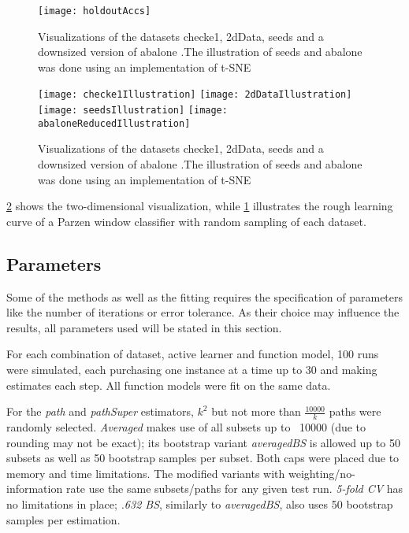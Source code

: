 \begin{figure}[h]
	\centering
	\texttt{[image: holdoutAccs]}
	\caption{Visualizations of the datasets checke1, 2dData, seeds and a downsized version of abalone \cite{Chapelle2005,KremplEtAl2014,CharytanowiczEtAl2010,NashEtAl1994}.\newline The illustration of seeds and abalone was done using an implementation of t-SNE \cite{vanDerMaaten2008}}
	\label{fig:holdoutAccs}
\end{figure}

\begin{figure}[h]
	\centering
	\texttt{[image: checke1Illustration]}
	\texttt{[image: 2dDataIllustration]}
	\texttt{[image: seedsIllustration]}
	\texttt{[image: abaloneReducedIllustration]}
	\caption{Visualizations of the datasets checke1, 2dData, seeds and a downsized version of abalone \cite{Chapelle2005,KremplEtAl2014,CharytanowiczEtAl2010,NashEtAl1994}.\newline The illustration of seeds and abalone was done using an implementation of t-SNE \cite{vanDerMaaten2008}}
	\label{fig:datasetIllustrations}
\end{figure}

\ref{fig:datasetIllustrations} shows the two-dimensional visualization, while \ref{fig:holdoutAccs} illustrates the rough learning curve of a Parzen window classifier with random sampling of each dataset.

\subsection{Parameters}

Some of the methods as well as the fitting requires the specification of parameters like the number of iterations or error tolerance. As their choice may influence the results, all parameters used will be stated in this section.

For each combination of dataset, active learner and function model, 100 runs were simulated, each purchasing one instance at a time up to 30 and making estimates each step. All function models were fit on the same data.

For the \textit{path} and \textit{pathSuper} estimators, $k^2$ but not more than $\frac{10000}{k}$ paths were randomly selected. \textit{Averaged} makes use of all subsets up to ~10000 (due to rounding may not be exact); its bootstrap variant \textit{averagedBS} is allowed up to 50 subsets as well as 50 bootstrap samples per subset. Both caps were placed due to memory and time limitations. The modified variants with weighting/no-information rate use the same subsets/paths for any given test run. \textit{5-fold CV} has no limitations in place; \textit{.632 BS}, similarly to \textit{averagedBS}, also uses 50 bootstrap samples per estimation.

